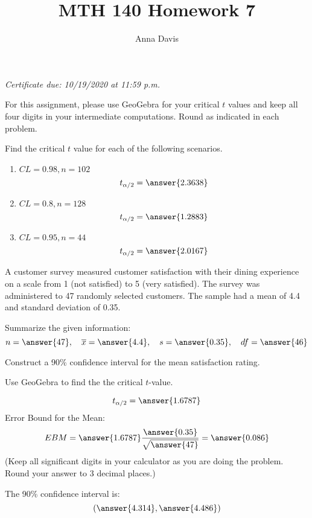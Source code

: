 \documentclass{ximera}
\author{Anna Davis} \title{MTH 140 Homework 7}
\begin{document}
\begin{abstract}

\end{abstract}
\maketitle
 \textit{Certificate due: 10/19/2020 at 11:59 p.m.}
 
 For this assignment, please use GeoGebra for your critical $t$ values and keep all four digits in your intermediate computations.  Round as indicated in each problem.
 
 \begin{problem}\label{prob:140hom7prob3}
 Find the critical $t$ value for each of the following scenarios.
 \begin{center}  
\end{center}
\begin{enumerate}
    \item $CL=0.98, n=102$
    $$t_{\alpha/2}=\answer{2.3638}$$
    \item $CL=0.8, n=128$
    $$t_{\alpha/2}=\answer{1.2883}$$
    \item $CL=0.95, n=44$
    $$t_{\alpha/2}=\answer{2.0167}$$
\end{enumerate}
 \end{problem}
 
 \begin{problem}\label{prob:140hom7prob1}
 A customer survey measured customer satisfaction with their dining experience on a scale from 1 (not satisfied) to 5 (very satisfied).  The survey was administered to 47 randomly selected customers.  The sample had a mean of 4.4 and standard deviation of 0.35.  
 
 Summarize the given information:
 $$n=\answer{47},\quad\overline{x}=\answer{4.4},\quad s=\answer{0.35},\quad df=\answer{46}$$
 
 Construct a 90\% confidence interval for the mean satisfaction rating.
 
  Use GeoGebra to find the the critical $t$-value. 
 \begin{center}  
\end{center}
$$t_{\alpha/2}=\answer{1.6787}$$
Error Bound for the Mean:
$$EBM=\answer{1.6787}\frac{\answer{0.35}}{\sqrt{\answer{47}}}=\answer{0.086}$$
(Keep all significant digits in your calculator as you are doing the problem.  Round your answer to 3 decimal places.)

The 90\% confidence interval is:
$$(\answer{4.314},\answer{4.486})$$
 
 \end{problem}
 
\end{document}
